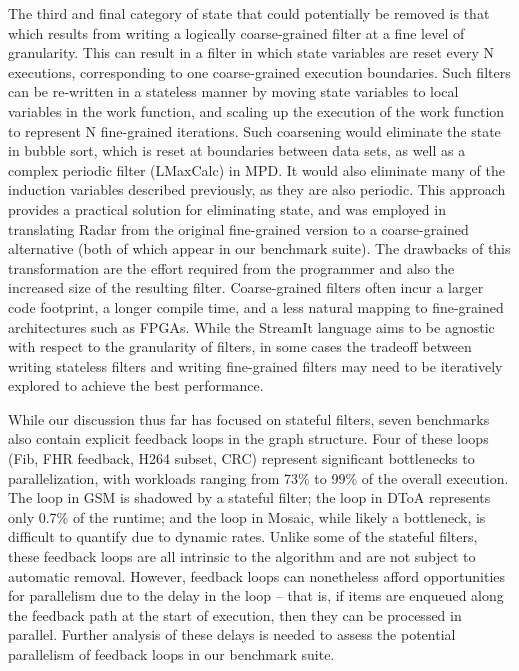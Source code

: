 The third and final category of state that could potentially be
removed is that which results from writing a logically coarse-grained
filter at a fine level of granularity.  This can result in a filter in
which state variables are reset every N executions, corresponding to
one coarse-grained execution boundaries.  Such filters can be
re-written in a stateless manner by moving state variables to local
variables in the work function, and scaling up the execution of the
work function to represent N fine-grained iterations.  Such coarsening
would eliminate the state in bubble sort, which is reset at boundaries
between data sets, as well as a complex periodic filter (LMaxCalc) in
MPD.  It would also eliminate many of the induction variables
described previously, as they are also periodic.  This approach
provides a practical solution for eliminating state, and was employed
in translating Radar from the original fine-grained version to a
coarse-grained alternative (both of which appear in our benchmark
suite).  The drawbacks of this transformation are the effort required
from the programmer and also the increased size of the resulting
filter.  Coarse-grained filters often incur a larger code footprint, a
longer compile time, and a less natural mapping to fine-grained
architectures such as FPGAs.  While the StreamIt language aims to be
agnostic with respect to the granularity of filters, in some cases the
tradeoff between writing stateless filters and writing fine-grained
filters may need to be iteratively explored to achieve the best
performance.

  While our discussion thus far
has focused on stateful filters, seven benchmarks also contain
explicit feedback loops in the graph structure.  Four of these loops
(Fib, FHR feedback, H264 subset, CRC) represent significant
bottlenecks to parallelization, with workloads ranging from 73\% to
99\% of the overall execution.  The loop in GSM is shadowed by a
stateful filter; the loop in DToA represents only 0.7\% of the
runtime; and the loop in Mosaic, while likely a bottleneck, is
difficult to quantify due to dynamic rates.  Unlike some of the
stateful filters, these feedback loops are all intrinsic to the
algorithm and are not subject to automatic removal.  However, feedback
loops can nonetheless afford opportunities for parallelism due to the
delay in the loop -- that is, if items are enqueued along the feedback
path at the start of execution, then they can be processed in
parallel.  Further analysis of these delays is needed to assess the
potential parallelism of feedback loops in our benchmark suite.


